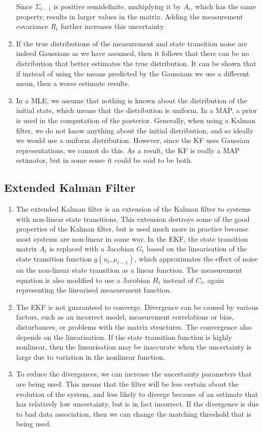 \documentclass[a4paper,12pt]{article}
\begin{document}
\begin{enumerate}
  Since $\Sigma_{t-1}$ is positive semidefinite, multiplying it by $A_t$, which
  has the same property, results in larger values in the matrix. Adding the
  measurement covariance $R_t$ further increases this uncertainty.
\item If the true distributions of the measurement and state transition noise
  are indeed Gaussians as we have assumed, then it follows that there can be no
  distribution that better estimates the true distribution. It can be shown that
  if instead of using the means predicted by the Gaussians we use a different
  mean, then a worse estimate results.
\item In a MLE, we assume that nothing is known about the distribution of the
  initial state, which means that the distribution is uniform. In a MAP, a prior
  is used in the computation of the posterior. Generally, when using a Kalman
  filter, we do not know anything about the initial distribution, and so ideally
  we would use a uniform distribution. However, since the KF uses Gaussian
  representations, we cannot do this. As a result, the KF is really a MAP
  estimator, but in some sense it could be said to be both.
\end{enumerate}
\subsection{Extended Kalman Filter}
\begin{enumerate}[resume]
\item The extended Kalman filter is an extension of the Kalman filter to systems
  with non-linear state transitions. This extension destroys some of the good
  properties of the Kalman filter, but is used much more in practice because
  most systems are non-linear in some way. In the EKF, the state transition
  matrix $A_t$ is replaced with a Jacobian $G_t$ based on the linearisation of
  the state transition function $g(u_t,\mu_{t-1})$, which approximates the
  effect of noise on the non-linear state transition as a linear function. The
  measurement equation is also modified to use a Jacobian $H_t$ instead of
  $C_t$, again representing the linearised measurement function.
\item The EKF is not guaranteed to converge. Divergence can be caused by various
  factors, such as an incorrect model, measurement correlations or bias,
  disturbances, or problems with the matrix structures. The convergence also
  depends on the linearisation. If the state transition function is highly
  nonlinear, then the linearisation may be inaccurate when the uncertainty is
  large due to variation in the nonlinear function.
\item To reduce the divergences, we can increase the uncertainty parameters that
  are being used. This means that the filter will be less certain about the
  evolution of the system, and less likely to diverge because of an estimate
  that has relatively low uncertainty, but is in fact incorrect. If the
  divergence is due to bad data association, then we can change the matching
  threshold that is being used.
\end{enumerate}
\end{document}
